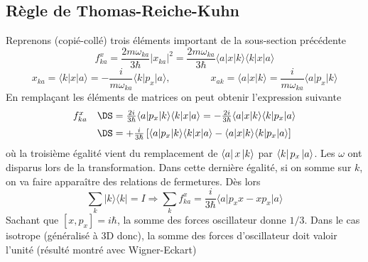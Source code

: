 \subsection{Règle de Thomas-Reiche-Kuhn}
Reprenons (copié-collé) trois éléments important de la sous-section précédente
\begin{equation}
f_{ka}^x =  \frac{2 m \omega_{ka}}{3 \hbar} \vert x_{ka} \vert^2 =
\frac{2m \omega_{ka}}{3 \hbar} \langle a \vert x \vert k \rangle 
\langle k \vert x \vert a \rangle
\end{equation}
\begin{equation}
x_{ka} = \langle k \vert x \vert a \rangle = - \frac{i}{m \omega_{ka}}
 \langle k \vert  p_x \vert a \rangle,\qquad\qquad
 x_{ak} = \langle a \vert x \vert k \rangle =  \frac{i}{m \omega_{ka}}
 \langle a \vert  p_x \vert k \rangle 
\end{equation}
En remplaçant les éléments de matrices on peut obtenir l'expression suivante
\begin{equation}
\begin{array}{ll}
f_{ka}^x &\DS=  \frac{2i}{3 \hbar} 
\langle a \vert p_x \vert k \rangle 
\langle k \vert x \vert a \rangle
= -\frac{2i}{3 \hbar} 
\langle a \vert x \vert k \rangle 
\langle k \vert p_x \vert a \rangle\vspace{2mm}\\
&\DS= + \frac{i}{3 \hbar} \left[ 
\langle a \vert p_x \vert k \rangle 
\langle k \vert x \vert a \rangle
- \langle a \vert x \vert k \rangle 
\langle k \vert p_x \vert a \rangle \right]
\end{array}
\end{equation}
où la troisième égalité vient du remplacement de $\bra{a}x\ket{k}$ par $\bra{k}p_x\ket{a}$. Les 
$\omega$ ont disparus lors de la transformation. Dans cette dernière égalité, si on somme sur $k$, 
on va faire apparaître des relations de fermetures. Dès lors
\begin{equation}
\sum_k \vert k \rangle \langle k \vert = I 
\Rightarrow \sum_k f_{ka}^x = \frac{i}{3 \hbar}
\langle a \vert p_x x - x p_x \vert a \rangle
\end{equation}
Sachant que $[x,p_x]=i\hbar$, la somme des forces oscillateur donne $1/3$. Dans le cas isotrope 
(généralisé à 3D donc), la somme des forces d'oscillateur doit valoir l'unité (résulté montré avec
Wigner-Eckart)\\

\ \\

